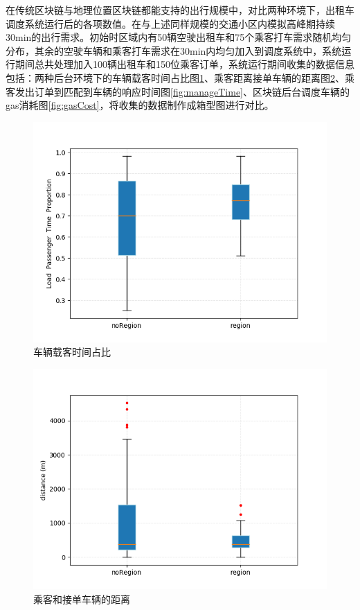 在传统区块链与地理位置区块链都能支持的出行规模中，对比两种环境下，出租车调度系统运行后的各项数值。在与上述同样规模的交通小区内模拟高峰期持续30min的出行需求。初始时区域内有50辆空驶出租车和75个乘客打车需求随机均匀分布，其余的空驶车辆和乘客打车需求在30min内均匀加入到调度系统中，系统运行期间总共处理加入100辆出租车和150位乘客订单，系统运行期间收集的数据信息包括：两种后台环境下的车辆载客时间占比图\ref{fig:loadPropotion}、乘客距离接单车辆的距离图\ref{fig:distance}、乘客发出订单到匹配到车辆的响应时间图\ref{fig:manageTime}、区块链后台调度车辆的gas消耗图\ref{fig:gasCost}，将收集的数据制作成箱型图进行对比。

\begin{figure}
  \centering
  \includegraphics[width=1.0\textwidth]{figures/loadPropotion}
  \caption{车辆载客时间占比}\label{fig:loadPropotion}
\end{figure}

\begin{figure}
  \centering
  \includegraphics[width=1.0\textwidth]{figures/distance}
  \caption{乘客和接单车辆的距离}\label{fig:distance}
\end{figure}

